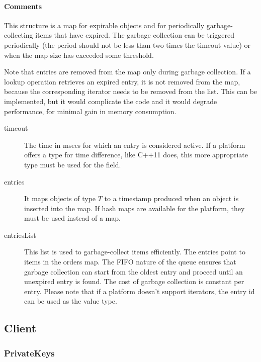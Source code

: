 \documentclass[a4paper,10pt]{article}
\begin{document}
\begin{inparaitem}[ ]
 \item \infrastructure
\end{inparaitem}

\paragraph*{Comments}
This structure is a map for expirable objects and for periodically garbage-collecting items that have expired. The garbage collection can be triggered periodically (the period 
should not be less than two times the timeout value) or when the map size has exceeded some threshold.

Note that entries are removed from the map only during garbage collection. If a lookup operation retrieves an expired entry, it is not removed from the map, because the 
corresponding iterator needs to be removed from the list. This can be implemented, but it would complicate the code and it would degrade performance, for minimal gain in memory 
consumption.

\SpecialItem
\begin{description}
 \item[timeout] The time in msecs for which an entry is considered active. If a platform offers a type for time difference, like C++11 does, this more appropriate type must be 
used for the field.
 \item[entries] It maps objects of type $T$ to a timestamp produced when an object is inserted into the map. If hash maps are available for the platform, they must be used instead 
of a map.
 \item[entriesList] This list is used to garbage-collect items efficiently. The entries point to items in the orders map. The FIFO nature of the queue ensures that garbage 
collection can start from the oldest entry and proceed until an unexpired entry is found. The cost of garbage collection is constant per entry. Please note that if a platform 
doesn't support iterators, the entry id can be used as the value type.
\end{description}

\subsection{Client}
\label{sec:structure:client}

\subsubsection{PrivateKeys}
\label{sec:structure:client:private_keys}
\end{document}
